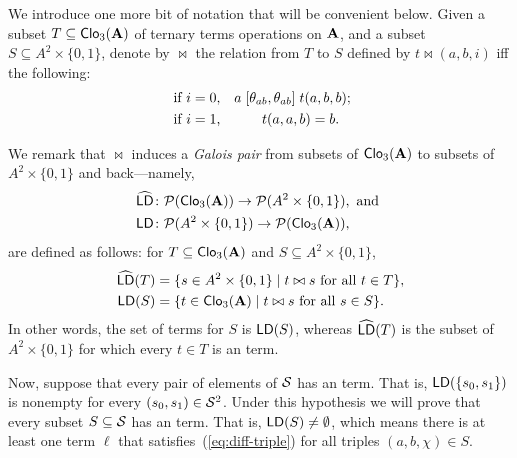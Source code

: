 We introduce one more bit of notation that will be convenient below.
Given a subset $T \subseteq \operatorname{\mathsf{Clo}}_3(\mathbf{A})$ of ternary terms operations on
$\mathbf{A}$, and a subset $S \subseteq A^2\times \{0,1\}$,
denote by $\bowtie$ the relation from $T$ to $S$ defined by
$t \bowtie (a,b,i)$ iff the following:
\begin{align*}
\text{ if $i=0$,} \quad & a \mathrel{[\theta_{ab}, \theta_{ab}]} t(a,b,b);\\
\text{ if $i=1$,} \quad & \qquad t(a,a,b)  = b. 
\end{align*}

We remark that $\bowtie$ induces a \emph{Galois pair} from subsets
of $\operatorname{\mathsf{Clo}}_3(\mathbf{A})$ to subsets of $A^2\times \{0,1\}$ and back---namely,
\begin{align*}
\mathsf{\widehat{LD}} &\colon \mathcal{P}(\operatorname{\mathsf{Clo}}_3(\mathbf{A})) \to \mathcal{P}(A^2\times \{0,1\}), \text{
  and }\\
\mathsf{LD} &\colon \mathcal{P}(A^2 \times \{0,1\}) \to \mathcal{P}(\operatorname{\mathsf{Clo}}_3(\mathbf{A})),
\end{align*}
are defined as follows:
for $T \subseteq \operatorname{\mathsf{Clo}}_3(\mathbf{A})$ and $S \subseteq A^2 \times \{0,1\}$,
\begin{align*}
  \mathsf{\widehat{LD}}(T) &= \{s \in A^2 \times \{0,1\} \mid t \bowtie s
  \text{ for all } t \in T\},\\
  \mathsf{LD}(S) &= \{t \in \operatorname{\mathsf{Clo}}_3(\mathbf{A}) \mid t \bowtie s
  \text{ for all } s \in S\}.
\end{align*}
In other words, the set of \ld terms for $S$ is
$\mathsf{LD}(S)$, whereas $\mathsf{\widehat{LD}}(T)$ is the subset of
$A^2\times \{0,1\}$ for which every $t\in T$ is an \ld term.

Now, suppose that every pair
of elements of $\mathcal{S}$ has an \ld term.
That is, $\mathsf{LD}(\{s_0, s_1\})$ is nonempty for every
$(s_0, s_1) \in \mathcal{S}^2$.%
Under this hypothesis we will prove that every subset $S\subseteq \mathcal{S}$
has an \ld term.
That is, $\mathsf{LD}(S) \neq \emptyset$, which means
there is at least one term $\ell$ that
satisfies~(\ref{eq:diff-triple}) for all triples
$(a, b, \chi) \in S$.

